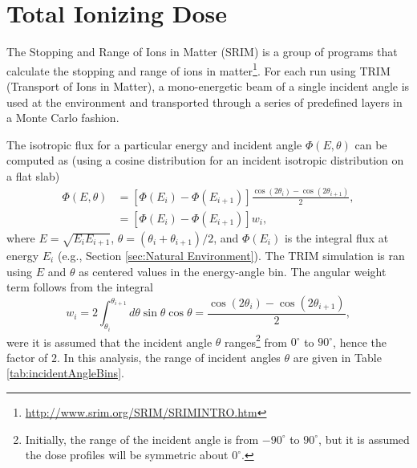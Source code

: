\documentclass{hitec}
\begin{document}
\section{Total Ionizing Dose}

The Stopping and Range of Ions in Matter (SRIM) is a group of programs that calculate the stopping and range of ions in matter\footnote{\url{http://www.srim.org/SRIM/SRIMINTRO.htm}}. %
For each run using TRIM (Transport of Ions in Matter), a mono-energetic beam of a single incident angle is used at the environment and transported through a series of predefined layers in a Monte Carlo fashion.

The isotropic flux for a particular energy and incident angle $\Phi(E,\theta)$ can be computed as (using a cosine distribution for an incident isotropic distribution on a flat slab)
\begin{align}
	\Phi(E,\theta) &= [\Phi(E_i) - \Phi(E_{i+1})] \frac{\cos(2\theta_i) - \cos(2\theta_{i+1})}{2},\nonumber\\
	&= [\Phi(E_i) - \Phi(E_{i+1})] w_i,
\end{align}
where $E = \sqrt{E_i E_{i+1}}$, $\theta = (\theta_i + \theta_{i+1})/2$, and $\Phi(E_i)$ is the integral flux at energy $E_i$ (e.g., Section \ref{sec:Natural Environment}). The TRIM simulation is ran using $E$ and $\theta$ as centered values in the energy-angle bin. The angular weight term follows from the integral
\begin{equation}
	w_i = 2\int_{\theta_i}^{\theta_{i+1}}d\theta\sin\theta\cos\theta = \frac{\cos(2\theta_i) - \cos(2\theta_{i+1})}{2},
\end{equation}
were it is assumed that the incident angle $\theta$ ranges\footnote{Initially, the range of the incident angle is from $-90^\circ$ to $90^\circ$, but it is assumed the dose profiles will be symmetric about $0^\circ$.} from $0^\circ$ to $90^\circ$, hence the factor of $2$. In this analysis, the range of incident angles $\theta$ are given in Table \ref{tab:incidentAngleBins}.
\end{document}
